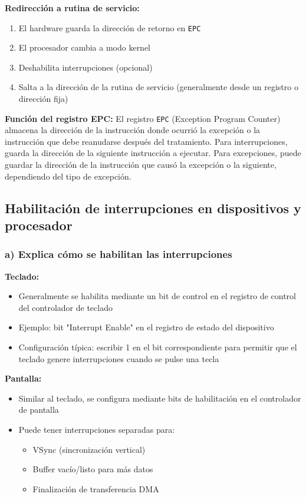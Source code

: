 \documentclass[12pt]{article}
\begin{document}
	\textbf{Redirección a rutina de servicio:}
	\begin{enumerate}
		\item El hardware guarda la dirección de retorno en \texttt{EPC}
		\item El procesador cambia a modo kernel
		\item Deshabilita interrupciones (opcional)
		\item Salta a la dirección de la rutina de servicio (generalmente desde un registro o dirección fija)
	\end{enumerate}
	
	\textbf{Función del registro EPC:}
	El registro \texttt{EPC} (Exception Program Counter) almacena la dirección de la instrucción donde ocurrió la excepción o la instrucción que debe reanudarse después del tratamiento. Para interrupciones, guarda la dirección de la siguiente instrucción a ejecutar. Para excepciones, puede guardar la dirección de la instrucción que causó la excepción o la siguiente, dependiendo del tipo de excepción.
	
	\subsection{Habilitación de interrupciones en dispositivos y procesador}
	
	\subsubsection{a) Explica cómo se habilitan las interrupciones}
	
	\textbf{Teclado:}
	\begin{itemize}
		\item Generalmente se habilita mediante un bit de control en el registro de control del controlador de teclado
		\item Ejemplo: bit "Interrupt Enable" en el registro de estado del dispositivo
		\item Configuración típica: escribir 1 en el bit correspondiente para permitir que el teclado genere interrupciones cuando se pulse una tecla
	\end{itemize}
	
	\textbf{Pantalla:}
	\begin{itemize}
		\item Similar al teclado, se configura mediante bits de habilitación en el controlador de pantalla
		\item Puede tener interrupciones separadas para:
		\begin{itemize}
			\item VSync (sincronización vertical)
			\item Buffer vacío/listo para más datos
			\item Finalización de transferencia DMA
		\end{itemize}
	\end{itemize}
	
\end{document}
